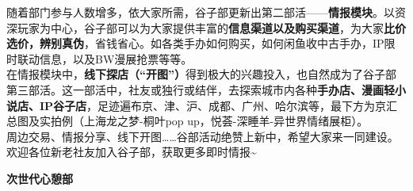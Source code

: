    \hfill
{}
    \par
\vspace{0.5em}
\chind 随着部门参与人数增多，依大家所需，谷子部更新出第二部活——\textbf{情报模块}。以资深玩家为中心，谷子部可以为大家提供丰富的\textbf{信息渠道以及购买渠道}，为大家\textbf{比价选价，辨别真伪}，省钱省心。如各类手办如何购买，如何闲鱼收中古手办，IP限时联动信息，以及BW漫展抢票等等。\\
\chind 在情报模块中，\textbf{线下探店（“开图”）}得到极大的兴趣投入，也自然成为了谷子部第三部活。这一部活中，社友或独行或结伴，去探索城市内各种\textbf{手办店、漫画轻小说店、IP谷子店}，足迹遍布京、津、沪、成都、广州、哈尔滨等，最下方为京汇总图及实拍例（上海龙之梦-桐叶pop up，悦荟-深睡羊-异世界情绪展柜）。\\
\chind 周边交易、情报分享、线下开图……谷部活动绝赞上新中，希望大家来一同建设。欢迎各位新老社友加入谷子部，获取更多即时情报\~{}
\par
{}
    \hfill
\newpage
    \fontsize{23pt}{24pt}\selectfont
    \textbf{\textcolor{truepurple}{次世代心憩部}}\\
    \vspace{0.7em}
